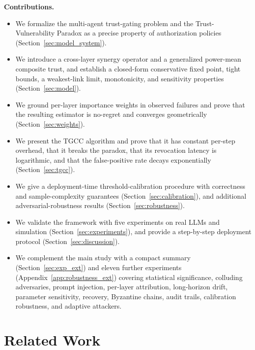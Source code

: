 \documentclass[sigconf,anonymous]{acmart}
\theoremstyle{plain}
\theoremstyle{definition}
\theoremstyle{remark}
\begin{document}
\textbf{Contributions.}
\begin{itemize}[leftmargin=1.2em,topsep=2pt,itemsep=2pt]
\item We formalize the multi-agent trust-gating problem and the Trust-Vulnerability
  Paradox as a precise property of authorization policies
  (Section~\ref{sec:model_system}).
\item We introduce a cross-layer synergy operator and a generalized power-mean composite
  trust, and establish a closed-form conservative fixed point, tight bounds, a
  weakest-link limit, monotonicity, and sensitivity properties (Section~\ref{sec:model}).
\item We ground per-layer importance weights in observed failures and prove that the
  resulting estimator is no-regret and converges geometrically
  (Section~\ref{sec:weights}).
\item We present the TGCC algorithm and prove that it has constant per-step overhead,
  that it breaks the paradox, that its revocation latency is logarithmic, and that the
  false-positive rate decays exponentially (Section~\ref{sec:tgcc}).
\item We give a deployment-time threshold-calibration procedure with correctness and
  sample-complexity guarantees (Section~\ref{sec:calibration}), and additional
  adversarial-robustness results (Section~\ref{sec:robustness}).
\item We validate the framework with five experiments on real LLMs and simulation
  (Section~\ref{sec:experiments}), and provide a step-by-step deployment protocol
  (Section~\ref{sec:discussion}).
\item We complement the main study with a compact summary (Section~\ref{sec:exp_ext})
  and eleven further experiments (Appendix~\ref{app:robustness_ext}) covering statistical
  significance, colluding adversaries, prompt injection, per-layer attribution,
  long-horizon drift, parameter sensitivity, recovery, Byzantine chains, audit trails,
  calibration robustness, and adaptive attackers.
\end{itemize}


\section{Related Work}
\label{sec:related}
\end{document}
